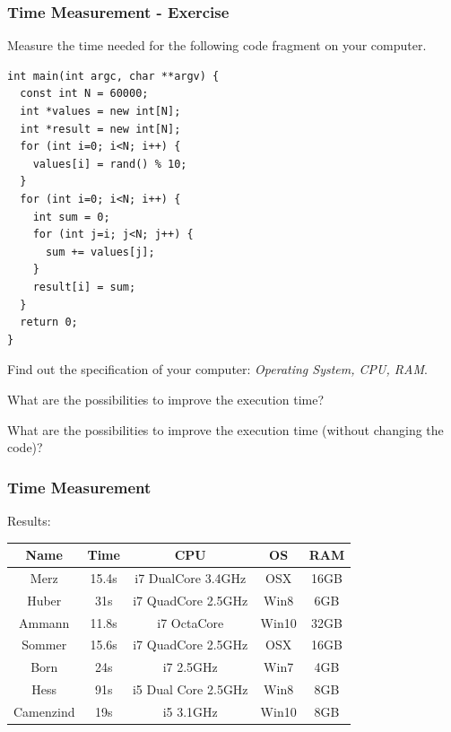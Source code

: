 \begin{frame}[fragile]
\frametitle{Time Measurement - Exercise}
{\tiny
\begin{exercise}
Measure the time needed for the following code fragment on your computer.
\begin{lstlisting}
int main(int argc, char **argv) {
  const int N = 60000;
  int *values = new int[N];
  int *result = new int[N];
  for (int i=0; i<N; i++) {
    values[i] = rand() % 10;
  }
  for (int i=0; i<N; i++) {
    int sum = 0;
    for (int j=i; j<N; j++) {
      sum += values[j];
    }
    result[i] = sum;
  }
  return 0;
}
\end{lstlisting}
\end{exercise}
\begin{exercise}
Find out the specification of your computer: \emph{Operating System, CPU, RAM}.
\end{exercise}
\begin{exercise}
What are the possibilities to improve the execution time?
\end{exercise}
\begin{exercise}
What are the possibilities to improve the execution time (without changing the code)?
\end{exercise}
}
\end{frame}

\begin{frame}[fragile]
\frametitle{Time Measurement}
Results:\\
\vspace{3mm}
\begin{tabular}{c|c|c|c|c}
Name & Time & CPU & OS & RAM\\
\hline
Merz & 15.4s & i7 DualCore 3.4GHz & OSX & 16GB\\
Huber & 31s & i7 QuadCore 2.5GHz & Win8 & 6GB\\
Ammann & 11.8s & i7 OctaCore & Win10 & 32GB\\
Sommer & 15.6s & i7 QuadCore 2.5GHz & OSX & 16GB\\
Born & 24s & i7 2.5GHz & Win7 & 4GB\\
Hess & 91s & i5 Dual Core 2.5GHz &  Win8 & 8GB\\
Camenzind & 19s & i5 3.1GHz & Win10 & 8GB
\end{tabular}
\end{frame}

